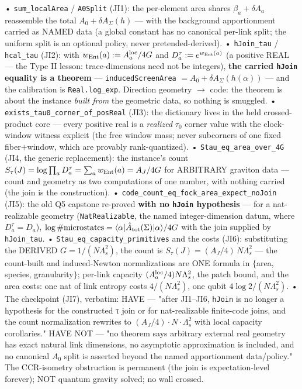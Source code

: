 \documentclass[11pt,a4paper]{article}
\begin{document}
  • \texttt{sum\_localArea} / \texttt{A0Split} (JI1): the per-element area shares $\beta_a + \delta A_a$ reassemble the total $A_0 + \delta A_\Sigma(h)$ — with the background apportionment carried as NAMED data (a global constant has no canonical per-link split; the uniform split is an optional policy, never pretended-derived).
  • \texttt{hJoin\_tau} / \texttt{hcal\_tau} (JI2): with $w_{\rm Ent}(a) := A^{\rm loc}_a/4G$ and $D^\tau_a := e^{w_{\rm Ent}(a)}$ (a positive REAL — the Type II lesson: trace-dimensions need not be integers), \textbf{the carried \texttt{hJoin} equality is a theorem} — \texttt{inducedScreenArea} $= A_0 + \delta A_\Sigma(h(\alpha))$ — and the calibration is \texttt{Real.log\_exp}. Direction geometry $\to$ code: the theorem is about the instance \emph{built from} the geometric data, so nothing is smuggled.
  • \texttt{exists\_tau0\_corner\_of\_posReal} (JI3): the dictionary lives in the held crossed-product core — every positive real is a \emph{realized} $\tau_0$ corner value with the clock-window witness explicit (the free window mass; never subcorners of one fixed fiber$+$window, which are provably rank-quantized).
  • \texttt{Stau\_eq\_area\_over\_4G} (JI4, the generic replacement): the instance's count $S_\tau(J) = \log\prod_a D^\tau_a = \sum_a w_{\rm Ent}(a) = A_J/4G$ for ARBITRARY graviton data — count and geometry as two computations of one number, with nothing carried (the join is the construction).
  • \texttt{code\_count\_eq\_fock\_area\_expect\_noJoin} (JI5): the old Q5 capstone re-proved \textbf{with no \texttt{hJoin} hypothesis} — for a nat-realizable geometry (\texttt{NatRealizable}, the named integer-dimension datum, where $D^\tau_a = D_a$), $\log\#\text{microstates} = \langle\alpha|\hat A_{\rm tot}(\Sigma)|\alpha\rangle/4G$ with the join supplied by \texttt{hJoin\_tau}.
  • \texttt{Stau\_eq\_capacity\_primitives} and the costs (JI6): substituting the DERIVED $G = 1/(N\Lambda_s^2)$, the count is $S_\tau(J) = (A_J/4)\,N\Lambda_s^2$ — the count-built and induced-Newton normalizations are ONE formula in $\{$area, species, granularity$\}$; per-link capacity $(A^{\rm loc}_a/4)N\Lambda_s^2$, the patch bound, and the area costs: one nat of link entropy costs $4/(N\Lambda_s^2)$, one qubit $4\log 2/(N\Lambda_s^2)$.
  • The checkpoint (JI7), verbatim: HAVE — "after JI1--JI6, \texttt{hJoin} is no longer a hypothesis for the constructed τ join or for nat-realizable finite-code joins, and the count normalization rewrites to $(A_J/4)\cdot N\cdot\Lambda_s^2$ with local capacity corollaries." HAVE NOT — "no theorem says arbitrary external real geometry has exact natural link dimensions, no asymptotic approximation is included, and no canonical $A_0$ split is asserted beyond the named apportionment data/policy." The CCR-isometry obstruction is permanent (the join is expectation-level forever); NOT quantum gravity solved; no wall crossed.
\end{document}
